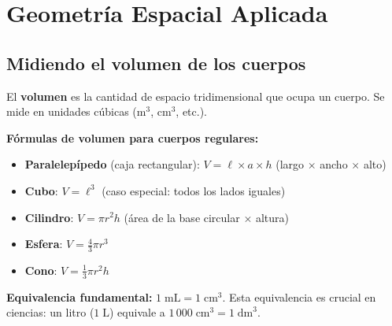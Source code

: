 \documentclass[12pt, letterpaper]{article}
\begin{document}
\section{Geometría Espacial Aplicada}

\subsection{Midiendo el volumen de los cuerpos}

El \textbf{volumen} es la cantidad de espacio tridimensional que ocupa un cuerpo. Se mide en unidades cúbicas ($\text{m}^3$, $\text{cm}^3$, etc.).

\begin{cuadroteoria}
  \textbf{Fórmulas de volumen para cuerpos regulares:}
  \begin{itemize}[leftmargin=*]
    \item \textbf{Paralelepípedo} (caja rectangular): $V = \ell \times a \times h$ (largo $\times$ ancho $\times$ alto)
    \item \textbf{Cubo}: $V = \ell^3$ (caso especial: todos los lados iguales)
    \item \textbf{Cilindro}: $V = \pi r^2 h$ (área de la base circular $\times$ altura)
    \item \textbf{Esfera}: $V = \frac{4}{3}\pi r^3$
    \item \textbf{Cono}: $V = \frac{1}{3}\pi r^2 h$
  \end{itemize}
\end{cuadroteoria}

\begin{cuadrosolucion}
  \textbf{Equivalencia fundamental:} $1\;\text{mL} = 1\;\text{cm}^3$. Esta equivalencia es crucial en ciencias: un litro ($1\;\text{L}$) equivale a $1\,000\;\text{cm}^3 = 1\;\text{dm}^3$.
\end{cuadrosolucion}
\end{document}
